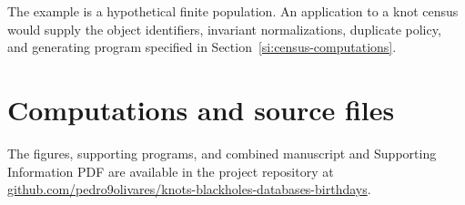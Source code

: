 \documentclass[9pt,twoside]{pnas-new}
\theoremstyle{definition}
\theoremstyle{remark}
\begin{document}
The example is a hypothetical finite population.  An application to a knot census would supply the object identifiers, invariant normalizations, duplicate policy, and generating program specified in Section~\ref{si:census-computations}.
\section{Computations and source files}
\label{sec:si-reproducibility}
The figures, supporting programs, and combined manuscript and Supporting Information PDF are available in the project repository at \href{https://github.com/pedro9olivares/knots-blackholes-databases-birthdays}{github.com/pedro9olivares/knots-blackholes-databases-birthdays}.
\FloatBarrier
\end{document}
